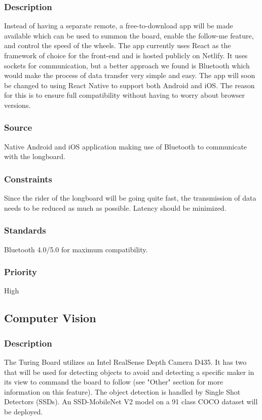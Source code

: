 \subsubsection{Description}
Instead of having a separate remote, a free-to-download app will be made available which can be used to summon the board, enable the follow-me feature, and control the speed of the wheels. The app currently uses React as the framework of choice for the front-end and is hosted publicly on Netlify. It uses sockets for communication, but a better approach we found is Bluetooth which would make the process of data transfer very simple and easy. The app  will soon be changed to using React Native to support both Android and iOS. The reason for this is to ensure full compatibility without having to worry about browser versions.
\subsubsection{Source}
Native Android and iOS application making use of Bluetooth to communicate with the longboard.
\subsubsection{Constraints}
Since the rider of the longboard will be going quite fast, the transmission of data needs to be reduced as much as possible. Latency should be minimized.
\subsubsection{Standards}
Bluetooth 4.0/5.0 for maximum compatibility.
\subsubsection{Priority}
High

\subsection{Computer Vision}
\subsubsection{Description}
The Turing Board utilizes an Intel RealSense Depth Camera D435. It has two that will be used for detecting objects to avoid and detecting a specific maker in its view to command the board to follow (see "Other" section for more information on this feature). The object detection is handled by Single Shot Detectors (SSDs). An SSD-MobileNet V2 model on a 91 class COCO dataset will be deployed.
